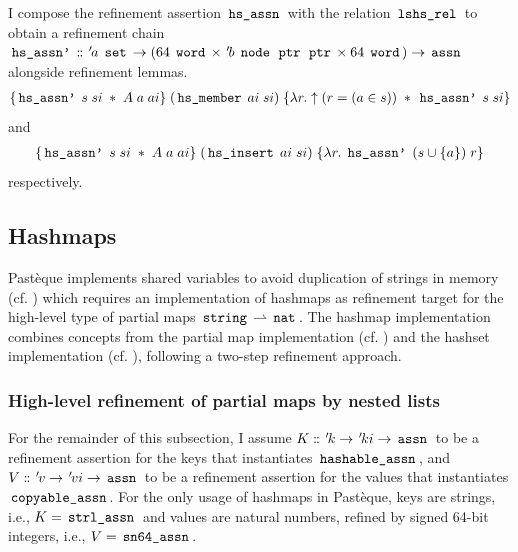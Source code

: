 I compose the refinement assertion $\,\text{\ttfamily hs\_assn}\,$ with the relation $\,\text{\ttfamily lshs\_rel}\,$ to obtain a refinement chain $\,\text{\ttfamily hs\_assn'}\, \mathrel{\mathord{:}\mkern-1.2mu\mathord{:}} {\mskip2mu '\mskip-2mua} \; \,\text{\ttfamily set}\, \rightarrow (64 \; \,\text{\ttfamily word}\, \times {\mskip2mu '\mskip-2mub} \; \,\text{\ttfamily node}\, \; \,\text{\ttfamily ptr}\, \; \,\text{\ttfamily ptr}\, \times 64 \; \,\text{\ttfamily word}\,) \rightarrow \,\text{\ttfamily assn}\,$ alongside refinement lemmas.
\begin{align*}
	\{\,\text{\ttfamily hs\_assn'}\, \; s \; si \; \ast \; A \; a \; ai\} \;
	(\,\text{\ttfamily hs\_member}\, \; ai \; si) \;
	\{\lambda r. \uparrow(r = (a \in s)) \; \ast \; \,\text{\ttfamily hs\_assn'}\, \; s \; si\}
\end{align*}
and
\begin{align*}
	\{\,\text{\ttfamily hs\_assn'}\, \; s \; si \; \ast \; A \; a \; ai\} \;
	(\,\text{\ttfamily hs\_insert}\, \; ai \; si) \;
	\{\lambda r. \; \,\text{\ttfamily hs\_assn'}\, \; (s \cup \{a\})\; r\}
\end{align*}
respectively.

\subsection{Hashmaps}\label{sec:hashmaps}

Pastèque implements shared variables to avoid duplication of strings in memory (cf. ) which requires an implementation of hashmaps as refinement target for the high-level type of partial maps $\,\text{\ttfamily string}\, \rightharpoonup \,\text{\ttfamily nat}\,$.
The hashmap implementation combines concepts from the partial map implementation (cf. ) and the hashset implementation (cf. ), following a two-step refinement approach.

\subsubsection{High-level refinement of partial maps by nested lists}\label{sec:hashmaps-partial-maps-by-nested-lists}
For the remainder of this subsection, I assume $K \mathrel{\mathord{:}\mkern-1.2mu\mathord{:}} {\mskip2mu '\mskip-2muk} \rightarrow {\mskip2mu '\mskip-2muki} \rightarrow \,\text{\ttfamily assn}\,$ to be a refinement assertion for the keys that instantiates $\,\text{\ttfamily hashable\_assn}\,$, and $V \mathrel{\mathord{:}\mkern-1.2mu\mathord{:}} {\mskip2mu '\mskip-2muv} \rightarrow {\mskip2mu '\mskip-2muvi} \rightarrow \,\text{\ttfamily assn}\,$ to be a refinement assertion for the values that instantiates $\,\text{\ttfamily copyable\_assn}\,$.
For the only usage of hashmaps in Pastèque, keys are strings, i.e., $K = \,\text{\ttfamily strl\_assn}\,$ and values are natural numbers, refined by signed 64-bit integers, i.e., $V = \,\text{\ttfamily sn64\_assn}\,$.

